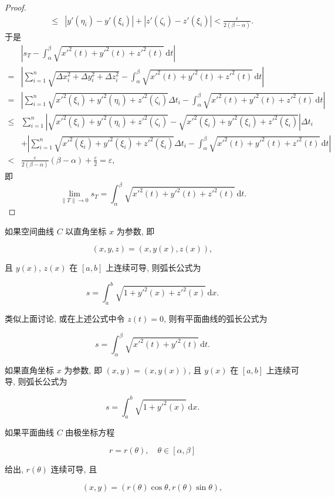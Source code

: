 \begin{proof}
\[\begin{aligned}
\leqslant&|y'(\eta_{i})-y'(\xi_{i})|+|z'(\zeta_{i})-z'(\xi_{i})|<\frac{\varepsilon}{2(\beta-\alpha)}.
\end{aligned}
\]
于是
\[
\begin{aligned}
&\left|s_{T}-\int_{\alpha}^{\beta}\sqrt{x'^{2}(t)+y'^{2}(t)+z'^{2}(t)}\,\mathrm{d}t\right|\\
=&\left|\sum_{i=1}^{n}\sqrt{\Delta x_{i}^{2}+\Delta y_{i}^{2}+\Delta z_{i}^{2}}-\int_{\alpha}^{\beta}\sqrt{x'^{2}(t)+y'^{2}(t)+z'^{2}(t)}\,\mathrm{d}t\right|\\
=&\left|\sum_{i=1}^{n}\sqrt{x'^{2}(\xi_{i})+y'^{2}(\eta_{i})+z'^{2}(\zeta_{i})}\Delta t_{i}-\int_{\alpha}^{\beta}\sqrt{x'^{2}(t)+y'^{2}(t)+z'^{2}(t)}\,\mathrm{d}t\right|\\
\leqslant&\sum_{i=1}^{n}\left|\sqrt{x'^{2}(\xi_{i})+y'^{2}(\eta_{i})+z'^{2}(\zeta_{i})}-\sqrt{x'^{2}(\xi_{i})+y'^{2}(\xi_{i})+z'^{2}(\xi_{i})}\right|\Delta t_{i}\\
&+\left|\sum_{i=1}^{n}\sqrt{x'^{2}(\xi_{i})+y'^{2}(\xi_{i})+z'^{2}(\xi_{i})}\Delta t_{i}-\int_{\alpha}^{\beta}\sqrt{x'^{2}(t)+y'^{2}(t)+z'^{2}(t)}\,\mathrm{d}t\right|\\
<&\frac{\varepsilon}{2(\beta-\alpha)}(\beta-\alpha)+\frac{\varepsilon}{2}=\varepsilon,
\end{aligned}
\]
即
\[
\lim_{\|T\|\to0}s_{T}=\int_{\alpha}^{\beta}\sqrt{x'^{2}(t)+y'^{2}(t)+z'^{2}(t)}\,\mathrm{d}t.
\]
\end{proof}

如果空间曲线 $C$ 以直角坐标 $x$ 为参数, 即

\[
(x,y,z)=(x,y(x),z(x)),
\]

且 $y(x)$, $z(x)$ 在 $[a,b]$ 上连续可导, 则弧长公式为

\[
s=\int_{a}^{b}\sqrt{1+y'^{2}(x)+z'^{2}(x)}\,\mathrm{d}x.
\]

类似上面讨论, 或在上述公式中令 $z(t)=0$, 则有平面曲线的弧长公式为

\[
s=\int_{\alpha}^{\beta}\sqrt{x'^{2}(t)+y'^{2}(t)}\,\mathrm{d}t.
\]

如果直角坐标 $x$ 为参数, 即 $(x,y)=(x,y(x))$, 且 $y(x)$ 在 $[a,b]$ 上连续可导, 则弧长公式为

\[
s=\int_{a}^{b}\sqrt{1+y'^{2}(x)}\,\mathrm{d}x.
\]

如果平面曲线 $C$ 由极坐标方程

\[
r=r(\theta),\quad\theta\in[\alpha,\beta]
\]

给出, $r(\theta)$ 连续可导, 且

\[
(x,y)=(r(\theta)\cos\theta,r(\theta)\sin\theta),
\]

